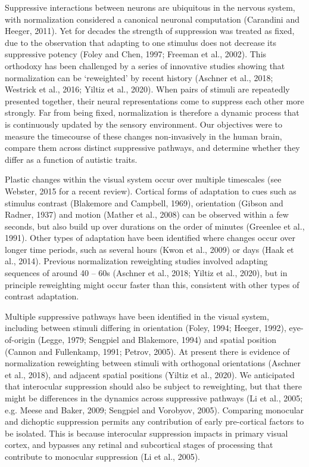 \documentclass[
]{article}
\begin{document}
Suppressive interactions between neurons are ubiquitous in the nervous system, with normalization considered a canonical neuronal computation (Carandini and Heeger, 2011). Yet for decades the strength of suppression was treated as fixed, due to the observation that adapting to one stimulus does not decrease its suppressive potency (Foley and Chen, 1997; Freeman et al., 2002). This orthodoxy has been challenged by a series of innovative studies showing that normalization can be `reweighted' by recent history (Aschner et al., 2018; Westrick et al., 2016; Yiltiz et al., 2020). When pairs of stimuli are repeatedly presented together, their neural representations come to suppress each other more strongly. Far from being fixed, normalization is therefore a dynamic process that is continuously updated by the sensory environment. Our objectives were to measure the timecourse of these changes non-invasively in the human brain, compare them across distinct suppressive pathways, and determine whether they differ as a function of autistic traits.

Plastic changes within the visual system occur over multiple timescales (see Webster, 2015 for a recent review). Cortical forms of adaptation to cues such as stimulus contrast (Blakemore and Campbell, 1969), orientation (Gibson and Radner, 1937) and motion (Mather et al., 2008) can be observed within a few seconds, but also build up over durations on the order of minutes (Greenlee et al., 1991). Other types of adaptation have been identified where changes occur over longer time periods, such as several hours (Kwon et al., 2009) or days (Haak et al., 2014). Previous normalization reweighting studies involved adapting sequences of around 40 -- 60s (Aschner et al., 2018; Yiltiz et al., 2020), but in principle reweighting might occur faster than this, consistent with other types of contrast adaptation.

Multiple suppressive pathways have been identified in the visual system, including between stimuli differing in orientation (Foley, 1994; Heeger, 1992), eye-of-origin (Legge, 1979; Sengpiel and Blakemore, 1994) and spatial position (Cannon and Fullenkamp, 1991; Petrov, 2005). At present there is evidence of normalization reweighting between stimuli with orthogonal orientations (Aschner et al., 2018), and adjacent spatial positions (Yiltiz et al., 2020). We anticipated that interocular suppression should also be subject to reweighting, but that there might be differences in the dynamics across suppressive pathways (Li et al., 2005; e.g. Meese and Baker, 2009; Sengpiel and Vorobyov, 2005). Comparing monocular and dichoptic suppression permits any contribution of early pre-cortical factors to be isolated. This is because interocular suppression impacts in primary visual cortex, and bypasses any retinal and subcortical stages of processing that contribute to monocular suppression (Li et al., 2005).
\end{document}
